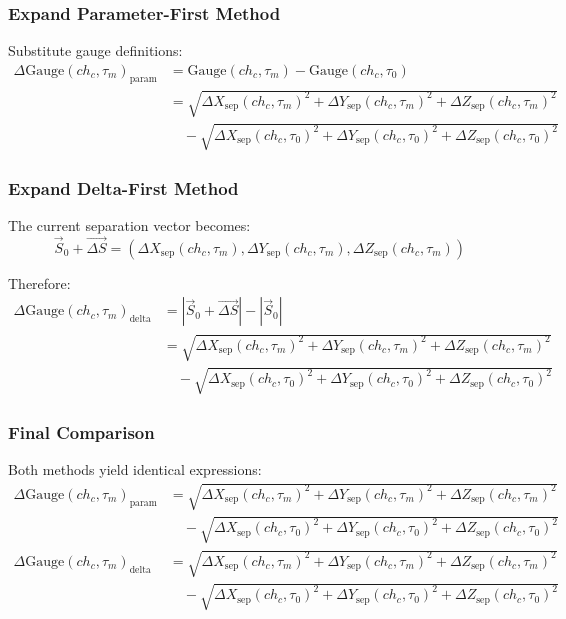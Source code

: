\documentclass{article}
\newcommand{\chainage}[1]{ch_{#1}}
\newcommand{\Gauge}[2]{\text{Gauge}(#1, #2)}
\newcommand{\DGauge}[2]{\Delta\text{Gauge}(#1, #2)}
\newcommand{\SepX}[2]{\Delta X_{\text{sep}}(#1, #2)}
\newcommand{\SepY}[2]{\Delta Y_{\text{sep}}(#1, #2)}
\newcommand{\SepZ}[2]{\Delta Z_{\text{sep}}(#1, #2)}
\begin{document}
\subsubsection{Expand Parameter-First Method}
Substitute gauge definitions:
\begin{align}
\DGauge{\chainage{c}}{\tau_m}_{\text{param}} &= \Gauge{\chainage{c}}{\tau_m} - \Gauge{\chainage{c}}{\tau_0} \\
&= \sqrt{\SepX{\chainage{c}}{\tau_m}^2 + \SepY{\chainage{c}}{\tau_m}^2 + \SepZ{\chainage{c}}{\tau_m}^2} \\
&\quad - \sqrt{\SepX{\chainage{c}}{\tau_0}^2 + \SepY{\chainage{c}}{\tau_0}^2 + \SepZ{\chainage{c}}{\tau_0}^2}
\end{align}

\subsubsection{Expand Delta-First Method}
The current separation vector becomes:
\begin{equation}
\vec{S}_0 + \vec{\Delta S} = (\SepX{\chainage{c}}{\tau_m}, \SepY{\chainage{c}}{\tau_m}, \SepZ{\chainage{c}}{\tau_m})
\end{equation}

Therefore:
\begin{align}
\DGauge{\chainage{c}}{\tau_m}_{\text{delta}} &= |\vec{S}_0 + \vec{\Delta S}| - |\vec{S}_0| \\
&= \sqrt{\SepX{\chainage{c}}{\tau_m}^2 + \SepY{\chainage{c}}{\tau_m}^2 + \SepZ{\chainage{c}}{\tau_m}^2} \\
&\quad - \sqrt{\SepX{\chainage{c}}{\tau_0}^2 + \SepY{\chainage{c}}{\tau_0}^2 + \SepZ{\chainage{c}}{\tau_0}^2}
\end{align}

\subsubsection{Final Comparison}
Both methods yield identical expressions:
\begin{align}
\DGauge{\chainage{c}}{\tau_m}_{\text{param}} &= \sqrt{\SepX{\chainage{c}}{\tau_m}^2 + \SepY{\chainage{c}}{\tau_m}^2 + \SepZ{\chainage{c}}{\tau_m}^2} \\
&\quad - \sqrt{\SepX{\chainage{c}}{\tau_0}^2 + \SepY{\chainage{c}}{\tau_0}^2 + \SepZ{\chainage{c}}{\tau_0}^2} \\
\DGauge{\chainage{c}}{\tau_m}_{\text{delta}} &= \sqrt{\SepX{\chainage{c}}{\tau_m}^2 + \SepY{\chainage{c}}{\tau_m}^2 + \SepZ{\chainage{c}}{\tau_m}^2} \\
&\quad - \sqrt{\SepX{\chainage{c}}{\tau_0}^2 + \SepY{\chainage{c}}{\tau_0}^2 + \SepZ{\chainage{c}}{\tau_0}^2}
\end{align}
\end{document}
